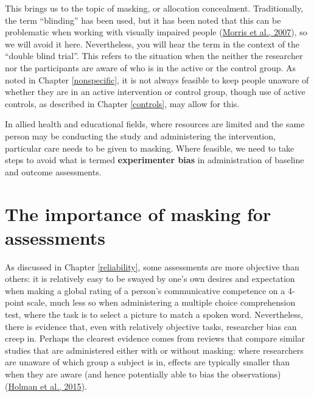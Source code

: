 \documentclass{krantz}
\begin{document}
This brings us to the topic of masking, or allocation concealment. Traditionally, the term ``blinding'' has been used, but it has been noted that this can be problematic when working with visually impaired people (\protect\hyperlink{ref-morris2007}{Morris et al., 2007}), so we will avoid it here. Nevertheless, you will hear the term in the context of the ``double blind trial''. This refers to the situation when the neither the researcher nor the participants are aware of who is in the active or the control group. As noted in Chapter \ref{nonspecific}, it is not always feasible to keep people unaware of whether they are in an active intervention or control group, though use of active controls, as described in Chapter \ref{controls}, may allow for this.

In allied health and educational fields, where resources are limited and the same person may be conducting the study and administering the intervention, particular care needs to be given to masking. Where feasible, we need to take steps to avoid what is termed \textbf{experimenter bias} in administration of baseline and outcome assessments.

\hypertarget{the-importance-of-masking-for-assessments}{%
\section{The importance of masking for assessments}\label{the-importance-of-masking-for-assessments}}

As discussed in Chapter \ref{reliability}, some assessments are more objective than others: it is relatively easy to be swayed by one's own desires and expectation when making a global rating of a person's communicative competence on a 4-point scale, much less so when administering a multiple choice comprehension test, where the task is to select a picture to match a spoken word. Nevertheless, there is evidence that, even with relatively objective tasks, researcher bias can creep in. Perhaps the clearest evidence comes from reviews that compare similar studies that are administered either with or without masking: where researchers are unaware of which group a subject is in, effects are typically smaller than when they are aware (and hence potentially able to bias the observations) (\protect\hyperlink{ref-holman2015}{Holman et al., 2015}).
\end{document}
